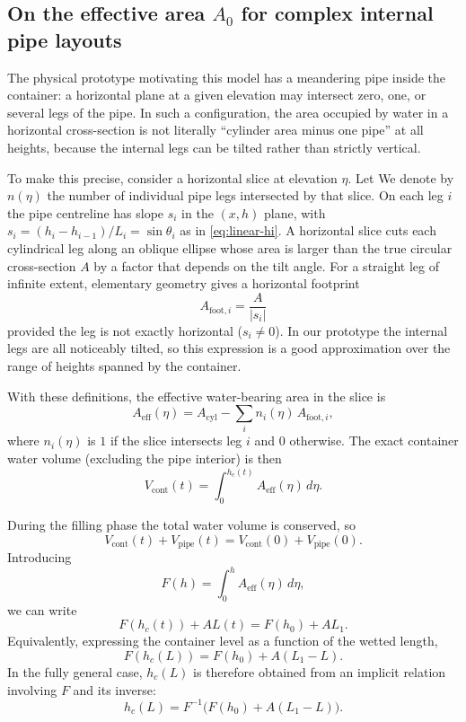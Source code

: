 \documentclass[11pt]{article}
\begin{document}
\subsection{On the effective area $A_0$ for complex internal pipe layouts}

The physical prototype motivating this model has a meandering pipe inside the container: a
horizontal plane at a given elevation may intersect zero, one, or several legs of the pipe.
In such a configuration, the area occupied by water in a horizontal cross-section is not
literally ``cylinder area minus one pipe'' at all heights, because the internal legs can be
tilted rather than strictly vertical.

To make this precise, consider a horizontal slice at elevation $\eta$. Let
We denote by $n(\eta)$ the number of individual pipe legs intersected by that slice. On
each leg $i$ the pipe centreline has slope $s_i$ in the $(x,h)$ plane, with
$s_i = (h_i-h_{i-1})/L_i = \sin\theta_i$ as in \eqref{eq:linear-hi}. A horizontal slice cuts
each cylindrical leg along an oblique ellipse whose area is larger than the true circular
cross-section $A$ by a factor that depends on the tilt angle. For a straight leg of infinite
extent, elementary geometry gives a horizontal footprint
\[
  A_{\text{foot},i} = \frac{A}{|s_i|}
\]
provided the leg is not exactly horizontal ($s_i\neq 0$). In our prototype the internal legs
are all noticeably tilted, so this expression is a good approximation over the range of
heights spanned by the container.

With these definitions, the effective water-bearing area in the slice is
\[
  A_{\text{eff}}(\eta)
  = A_{\text{cyl}} - \sum_{i} n_i(\eta)\,A_{\text{foot},i},
\]
where $n_i(\eta)$ is $1$ if the slice intersects leg $i$ and $0$ otherwise. The exact
container water volume (excluding the pipe interior) is then
\[
  V_{\text{cont}}(t)
  = \int_0^{h_c(t)} A_{\text{eff}}(\eta)\,d\eta.
\]

During the filling phase the total water volume is conserved, so
\[
  V_{\text{cont}}(t) + V_{\text{pipe}}(t)
  = V_{\text{cont}}(0) + V_{\text{pipe}}(0).
\]
Introducing
\[
  F(h) = \int_0^{h} A_{\text{eff}}(\eta)\,d\eta,
\]
we can write
\[
  F(h_c(t)) + A L(t) = F(h_0) + A L_1.
\]
Equivalently, expressing the container level as a function of the wetted length,
\[
  F(h_c(L)) = F(h_0) + A (L_1 - L).
\]
In the fully general case, $h_c(L)$ is therefore obtained from an implicit relation involving
$F$ and its inverse:
\[
  h_c(L) = F^{-1}\Big(F(h_0) + A (L_1 - L)\Big).
\]
\end{document}
